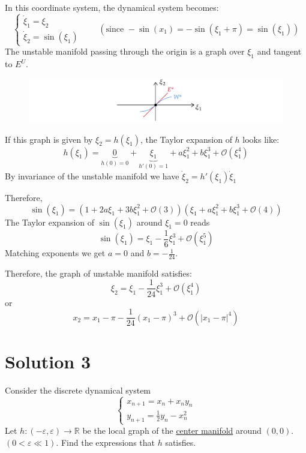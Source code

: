 \documentclass[twoside,10pt,a4paper]{article}
\begin{document}
In this coordinate system, the dynamical system becomes:
\begin{equation*}
	\begin{cases}
		\dot{\xi}_1 = \xi_2 \\
		\dot{\xi}_2 = \sin(\xi_1)
	\end{cases} \qquad (\text{since } -\sin(x_1) = -\sin(\xi_1 + \pi) = \sin(\xi_1))
\end{equation*}
The unstable manifold passing through the origin is a graph over $\xi_1$ and tangent to $E^U$.
\begin{figure}[H]
	\centering
	\includegraphics[scale=0.9]{Graphics/S02D03.pdf}
\end{figure}
If this graph is given by $\xi_2 = h(\xi_1)$, the Taylor expansion of $h$ looks like:
\begin{equation*}
	h(\xi_1) = \underbrace{0}_{h(0)=0} + \underbrace{\xi_1}_{h'(0)=1} + a\xi_1^2 + b\xi_1^3 + \mathcal{O}(\xi_1^4)
\end{equation*}
By invariance of the unstable manifold we have $\dot{\xi}_2 = h'(\xi_1) \dot{\xi}_1$

Therefore,
\begin{equation*}
	\sin(\xi_1) = (1 + 2a\xi_1 + 3b\xi_1^2 + \mathcal{O}(3))(\xi_1 + a\xi_1^2 + b\xi_1^3 + \mathcal{O}(4))
\end{equation*}
The Taylor expansion of $\sin(\xi_1)$ around $\xi_1=0$ reads
\begin{equation*}
	\sin(\xi_1) = \xi_1 - \frac{1}{6}\xi_1^3 + \mathcal{O}(\xi_1^5)
\end{equation*}
Matching exponents we get $a = 0$ and $b = -\frac{1}{24}$.

Therefore, the graph of unstable manifold satisfies:
\begin{equation*}
	\xi_2 = \xi_1 - \frac{1}{24}\xi_1^3 + \mathcal{O}(\xi_1^4)
\end{equation*}
or
\begin{equation*}\boxed{
	x_2 = x_1 - \pi -\frac{1}{24}(x_1 - \pi)^3 + \mathcal{O}(|x_1 - \pi|^4)
}\end{equation*}

\newpage

\section*{Solution 3}
Consider the discrete dynamical system
\begin{equation*}
	\begin{cases}
		x_{n+1} = x_n + x_ny_n \\
		y_{n+1} = \frac{1}{2}y_n - x_n^2
	\end{cases}
\end{equation*}
Let $h:(-\varepsilon, \varepsilon) \longrightarrow \mathbb{R}$ be the local graph of the \underline{center manifold} around $(0,0)$. $(0 < \varepsilon \ll 1)$. Find the expressions that $h$ satisfies.
\end{document}
